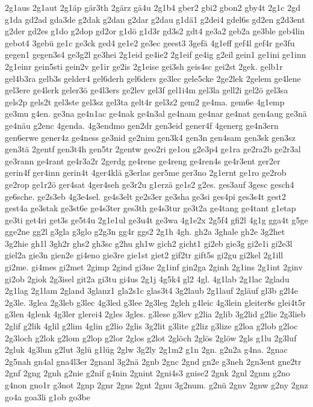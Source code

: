 {2g1aus
2g1aut
2g1äp
gär3th
2gärz
gä4u
2g1b4
gber2
gbi2
gbon2
gby4t
2g1c
2gd
g1da
gd2ad
gda3de
g2dak
g2dan
g2dar
g2dau
g1dä1
g2dei4
gdel6s
gd2en
g2d3ent
g2der
gd2es
g1do
g2dop
gd2or
g1dö
g1d3r
gd3s2
gdt4
ge3a2
geb2a
ge3ble
geb4lin
gebot4
3gebü
ge1c
ge3ck
ged4
ge1e2
ge3ec
geest3
3gefä
4g1eff
gef4l
gef4r
ge3fu
gegen1
gegen3s4
ge3g2l
ge3hei
2g1eid
ge4ie2
2g1eif
ge4ig
g2eil
gein1
ge1ini
ge1inn
2g1einr
gein5sti
gein2v
ge1ir
ge2is
2g1eise
gei3sh
geis4sc
gei2st
2gek.
gelb1r
gel4b3ra
gelb3s
gelder4
gel6derh
gel6ders
ge3lec
gele5cke
2ge2lek
2gelem
ge4lene
gel3ere
ge4lerk
geler3ö
ge4l3ers
ge2lev
gel3f
gel1i4m
gel3la
gell2i
gel2ö
gel3sa
gels2p
gels2t
gel3ste
gel3sz
gel3ta
gelt4r
gel3z2
gem2
ge4ma.
gem6e
4g1emp
ge3mu
g4en.
ge3na
ge4n1ac
ge4nak
ge4n3al
ge4nam
ge4nar
ge4nat
gen4aug
ge3nä
ge4näu
g2enc
4genda.
4g3endmo
gen2dr
gen3eid
gener4f
4generg
ge4n3ern
gen6erwe
gener4z
ge4ness
ge3nid
ge2nim
gen3k4
gen3n
gen4sam
gen3sk
gen3sz
gen3tä
2gentf
gen3t4h
gen5tr
2gentw
geo2ri
ge1ou
g2e3p4
ge1ra
ge2ra2b
ge2r3al
ge3rann
ge4rant
ge4r3a2r
2gerdg
ge4rene
ge4reng
ge4ren4s
ge4r3ent
ger2er
gerin4f
ger4inn
gerin4t
4ger4klä
g3erlas
ger5me
ger3no
2g1ernt
ge1ro
ge2rob
ge2rop
ge1r2ö
ger4sat
4ger4seh
ge3r2u
g1erzä
ge1s2
g2es.
ges3auf
3gesc
gesch4
ge6sche.
ge2s3eb
4g3e4sel.
ge4s3elt
ge2s3er
ge3sha
ge3si
ges4pi
ges3s4t
gest2
gest4a
ge3stak
ge3st6e
ge4s3ter
ges3th
ge4s3tur
ge3t2a
ge4tang
ge4tant
g1etap
ge3ti
get4ri
get3s
ge5t4u
2g1e1ul
ge3u4t
ge3wa
4g1e2x
2g5f4
gfi2l
4g1g
gga4t
g5ge
gge2ne
gg2l
g3gla
g3glo
g2g3n
gg4r
ggs2
2g1h
4gh.
gh2a
3ghale
gh2e
3g2het
3g2hie
gh1l
3gh2r
ghs2
gh3sc
g2hu
gh1w
gich2
gicht1
gi2eb
gie3g
gi2e1i
gi2e3l
giel2a
gie3n
gien2e
gi4eno
gie3re
gie1st
giet2
gif2tr
gift5s
gi2gu
gi2kel
2g1ill
gi2me.
gi4mes
gi2met
2gimp
2gind
gi3ne
2g1inf
gin2ga
2ginh
2g1ins
2g1int
2ginv
gi2ob
2giok
2g3isel
git2a
gi3tu
gi4us
2g1j
4g5k4
gl2
4gl.
4g1lab
2g1lac
2gladu
2g1lag
2g1lam
2gland
3glanz1
gla2s1c
glas3t4
3g2laub
2g1lauf
2gläuf
gl3b
g2l4e
2g3le.
3glea
2g3leb
g3lec
4g3led
g3lee
2g3leg
2gleh
g4leic
4g3lein
gleiter8s
glei4t5r
g3len
4glenk
4g3ler
glerei4
2gles
3gles.
g3lese
g3lev
g2lia
2glib
3g2lid
g2lie
2g3lieb
2glif
g2lik
4glil
g2lim
4glin
g2lio
2glis
3g2lit
g3lite
g2liz
g3lize
g2loa
g2lob
g2loc
2g3loch
g2lok
g2lom
g2lop
g2lor
2glos
g2lot
2glöch
2glös
2glöw
2gls
g1lu
2g3luf
2gluk
4g3lun
g2lut
3glü
g1lüg
2glw
3g2ly
2g1m2
g1n
2gn.
g2n2a
g4na.
2gnac
2g5nah
gn4al
gna4l3er
2gnanl
3g2nä
2gnb
2gnc
2gnd
gn2e
g3neh
2gn3ent
gne2tr
2gnf
2gng
2gnh
g2nie
g2nif
g4nin
2gnint
2gni4s3
gnise2
2gnk
2gnl
2gnm
g2no
g4non
gno1r
g3not
2gnp
2gnr
2gns
2gnt
2gnu
3g2num.
g2nü
2gnv
2gnw
g2ny
2gnz
go4a
goa3li
g1ob
go3be
}
